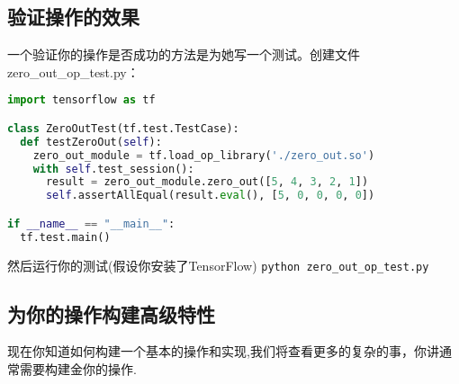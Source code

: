 \subsection{验证操作的效果}
一个验证你的操作是否成功的方法是为她写一个测试。创建文件zero\_out\_op\_test.py：
\begin{lstlisting}[language=Python]
import tensorflow as tf

class ZeroOutTest(tf.test.TestCase):
  def testZeroOut(self):
    zero_out_module = tf.load_op_library('./zero_out.so')
    with self.test_session():
      result = zero_out_module.zero_out([5, 4, 3, 2, 1])
      self.assertAllEqual(result.eval(), [5, 0, 0, 0, 0])

if __name__ == "__main__":
  tf.test.main()
\end{lstlisting}
然后运行你的测试(假设你安装了TensorFlow)
\lstinline[language=Bash]{python zero_out_op_test.py}
\subsection{为你的操作构建高级特性}
现在你知道如何构建一个基本的操作和实现,我们将查看更多的复杂的事，你讲通常需要构建金你的操作.
